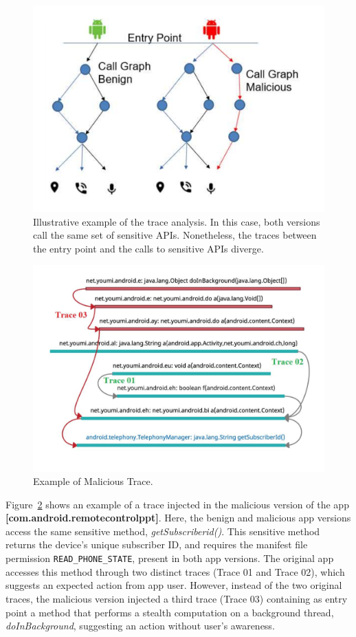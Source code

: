 \begin{figure}[ht]
\centering
\includegraphics[scale=0.30]{images/maliciousCallGraph.pdf}
\caption{Illustrative example of the trace analysis. In this case, both versions call the same set of sensitive APIs. Nonetheless,
the traces between the entry point and the calls to sensitive APIs diverge.}
 \label{fig:callGraph}
\end{figure}

\begin{figure}
\centering
\includegraphics[scale=0.28]{images/maliciousTrace_example01.pdf}
\caption{Example of Malicious Trace.}
 \label{fig:maliciousTrace}
\end{figure}


Figure~\ref{fig:maliciousTrace} shows an example of a trace injected in the malicious version of the
app \textbf{[com.android.remotecontrolppt]}. Here, the benign and malicious app versions access the same
sensitive method, \textit{getSubscriberid()}. This sensitive method returns the device's unique
subscriber ID, and requires the manifest file permission \texttt{READ\_PHONE\_STATE}, present in both app versions.
The original app accesses this method through two distinct traces (Trace 01 and Trace 02), which suggests an expected action from app user. However,
instead of the two original traces, the malicious version injected a third trace (Trace 03) containing as entry point a method that performs a stealth
computation on a background thread, \textit{doInBackground}, suggesting an action without user's awareness.

